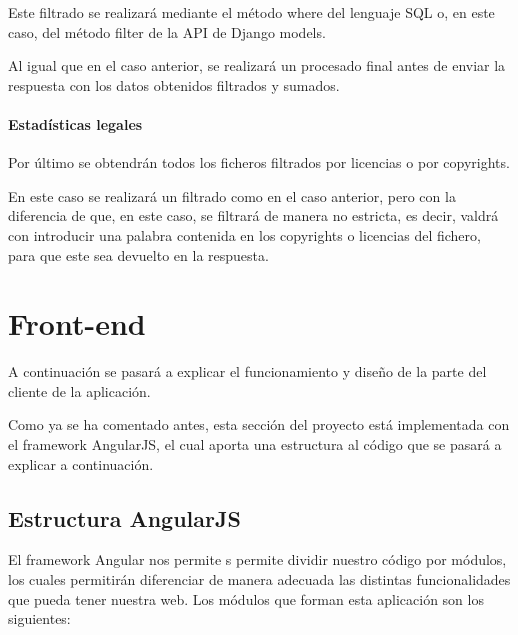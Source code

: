 \documentclass[a4paper, spanish, 12pt]{book}
\begin{document}
Este filtrado se realizar\'a mediante el m\'etodo where del lenguaje SQL o, en este
caso, del m\'etodo filter de la API de Django models.

Al igual que en el caso anterior, se realizar\'a un procesado final antes de enviar
la respuesta con los datos obtenidos filtrados y sumados.

\paragraph*{Estad\'isticas legales}
\label{paragraph:legal_stats}

Por \'ultimo se obtendr\'an todos los ficheros filtrados por licencias o por
copyrights.

En este caso se realizar\'a un filtrado como en el caso anterior, pero con la
diferencia de que, en este caso, se filtrar\'a de manera no estricta, es decir,
valdr\'a con introducir una palabra contenida en los copyrights o licencias del fichero,
para que este sea devuelto en la respuesta.

\section{Front-end}
\label{sec:front-end}

A continuaci\'on se pasar\'a a explicar el funcionamiento y dise\~no de la parte
del cliente de la aplicaci\'on.

Como ya se ha comentado antes, esta secci\'on del proyecto est\'a implementada
con el framework AngularJS, el cual aporta una estructura al c\'odigo que se
pasar\'a a explicar a continuaci\'on.

\subsection{Estructura AngularJS}
\label{subsec:angular_structure}

El framework Angular nos permite s permite dividir nuestro c\'odigo por m\'odulos, los
cuales permitir\'an diferenciar de manera adecuada las distintas funcionalidades
que pueda tener nuestra web. Los m\'odulos que forman esta aplicaci\'on son los
siguientes:
\end{document}
